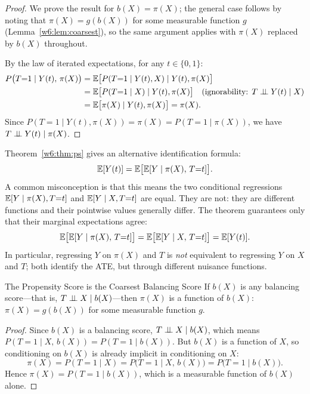 \documentclass[master.tex]{subfiles}
\begin{document}
\begin{proof}
We prove the result for $b(X) = \pi(X)$; the general case follows
by noting that $\pi(X) = g(b(X))$ for some measurable function $g$
(Lemma~\ref{w6:lem:coarsest}), so the same argument applies
with $\pi(X)$ replaced by $b(X)$ throughout.

By the law of iterated expectations, for any $t \in \{0,1\}$:
\begin{align*}
  P\bigl(T{=}1 \mid Y(t),\, \pi(X)\bigr)
  &= \mathbb{E}\bigl[P(T{=}1 \mid Y(t), X) \mid Y(t), \pi(X)\bigr] \\
  &= \mathbb{E}\bigl[P(T{=}1 \mid X) \mid Y(t), \pi(X)\bigr]
     \quad\text{(ignorability: }T \perp\!\!\!\perp Y(t) \mid X\text{)} \\
  &= \mathbb{E}\bigl[\pi(X) \mid Y(t), \pi(X)\bigr] = \pi(X).
\end{align*}
Since $P(T{=}1 \mid Y(t), \pi(X)) = \pi(X) = P(T{=}1 \mid \pi(X))$, we
have $T \perp\!\!\!\perp Y(t) \mid \pi(X)$.
\end{proof}

\begin{remark}
\label{w6:rem:conditional-exp}
Theorem~\ref{w6:thm:ps} gives an alternative identification formula:
\[
  \mathbb{E}[Y(t)] = \mathbb{E}\bigl[\mathbb{E}[Y \mid \pi(X),\, T{=}t]\bigr].
\]
A common misconception is that this means the two conditional
regressions $\mathbb{E}[Y \mid \pi(X), T{=}t]$ and $\mathbb{E}[Y \mid X, T{=}t]$
are equal.  They are not: they are different functions and their
pointwise values generally differ.  The theorem guarantees only that
their marginal expectations agree:
\[
  \mathbb{E}\bigl[\mathbb{E}[Y \mid \pi(X),\, T{=}t]\bigr]
  = \mathbb{E}\bigl[\mathbb{E}[Y \mid X,\, T{=}t]\bigr]
  = \mathbb{E}[Y(t)].
\]
In particular, regressing $Y$ on $\pi(X)$ and $T$ is \emph{not}
equivalent to regressing $Y$ on $X$ and $T$; both identify the ATE,
but through different nuisance functions.
\end{remark}

\begin{lemma}{The Propensity Score is the Coarsest Balancing Score \citep{imbens2015causal}}
\label{w6:lem:coarsest}
If $b(X)$ is any balancing score---that is, $T \perp\!\!\!\perp X \mid b(X)$---then
$\pi(X)$ is a function of $b(X)$: $\pi(X) = g(b(X))$ for some measurable
function $g$.
\end{lemma}

\begin{proof}
Since $b(X)$ is a balancing score, $T \perp\!\!\!\perp X \mid b(X)$, which means
$P(T{=}1 \mid X,\, b(X)) = P(T{=}1 \mid b(X))$.  But $b(X)$ is a
function of $X$, so conditioning on $b(X)$ is already implicit in
conditioning on $X$:
\[
  \pi(X) = P(T{=}1 \mid X) = P\bigl(T{=}1 \mid X,\, b(X)\bigr)
        = P\bigl(T{=}1 \mid b(X)\bigr).
\]
Hence $\pi(X) = P(T{=}1 \mid b(X))$, which is a measurable function of
$b(X)$ alone.
\end{proof}
\end{document}
